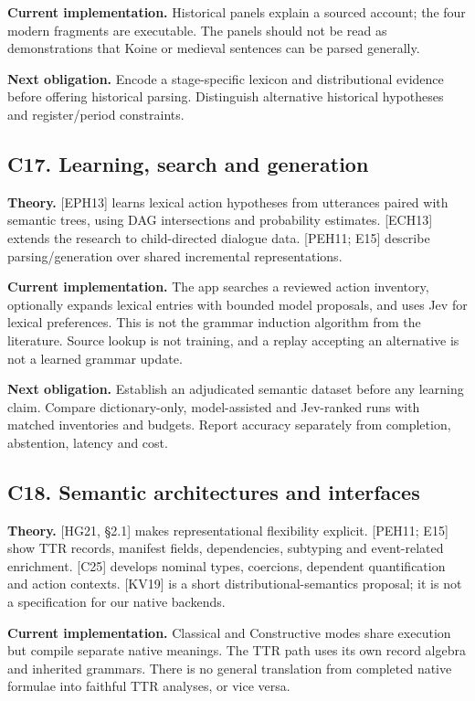 \documentclass[11pt,a4paper]{article}
\begin{document}
\textbf{Current implementation.} Historical panels explain a sourced
account; the four modern fragments are executable. The panels should not
be read as demonstrations that Koine or medieval sentences can be parsed
generally.

\textbf{Next obligation.} Encode a stage-specific lexicon and
distributional evidence before offering historical parsing. Distinguish
alternative historical hypotheses and register/period constraints.

\subsection{C17. Learning, search and
generation}\label{c17.-learning-search-and-generation}

\textbf{Theory.} {[}EPH13{]} learns lexical action hypotheses from
utterances paired with semantic trees, using DAG intersections and
probability estimates. {[}ECH13{]} extends the research to
child-directed dialogue data. {[}PEH11; E15{]} describe
parsing/generation over shared incremental representations.

\textbf{Current implementation.} The app searches a reviewed action
inventory, optionally expands lexical entries with bounded model
proposals, and uses Jev for lexical preferences. This is not the grammar
induction algorithm from the literature. Source lookup is not training,
and a replay accepting an alternative is not a learned grammar update.

\textbf{Next obligation.} Establish an adjudicated semantic dataset
before any learning claim. Compare dictionary-only, model-assisted and
Jev-ranked runs with matched inventories and budgets. Report accuracy
separately from completion, abstention, latency and cost.

\subsection{C18. Semantic architectures and
interfaces}\label{c18.-semantic-architectures-and-interfaces}

\textbf{Theory.} {[}HG21, §2.1{]} makes representational flexibility
explicit. {[}PEH11; E15{]} show TTR records, manifest fields,
dependencies, subtyping and event-related enrichment. {[}C25{]} develops
nominal types, coercions, dependent quantification and action contexts.
{[}KV19{]} is a short distributional-semantics proposal; it is not a
specification for our native backends.

\textbf{Current implementation.} Classical and Constructive modes share
execution but compile separate native meanings. The TTR path uses its
own record algebra and inherited grammars. There is no general
translation from completed native formulae into faithful TTR analyses,
or vice versa.
\end{document}
